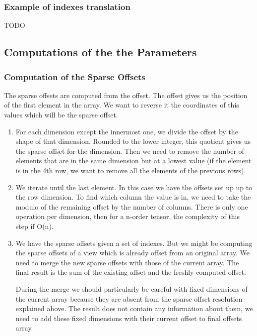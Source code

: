\subsubsection{Example of indexes translation}
TODO

\subsection{Computations of the the Parameters}
\subsubsection{Computation of the Sparse Offsets}
\label{sssec:sparseOff}
The sparse offsets are computed from the offset. The offset gives us the position of the first element in the array. We want to reverse it the coordinates of this values which will be the sparse offset. 


\begin{enumerate}
	\item For each dimension except the innermost one, we divide the offset by the shape of that dimension. Rounded to the lower integer, this quotient gives us the sparse offset for the dimension. Then we need to remove the number of elements that are in the same dimension but at a lowest value (if the element is in the 4th row, we want to remove all the elements of the previous rows).
	
	\item We iterate until the last element. In this case we have the offsets set up up to the row dimension. To find which column the value is in, we need to take the modulo of the remaining offset by the number of columns. There is only one operation per dimension, then for a n-order tensor, the complexity of this step if O(n).
	
	\item We have the sparse offsets given a set of indexes. But we might be computing the sparse offsets of a view which is already offset from an original array. We need to merge the new sparse offsets with those of the current array. The final result is the sum of the existing offset and the freshly computed offset.
	
	
	During the merge we should particularly be careful with fixed dimensions of the current array because they are absent from the sparse offset resolution explained above. The result does not contain any information about them, we need to add these fixed dimensions with their current offset to final offsets array. 

\end{enumerate}

